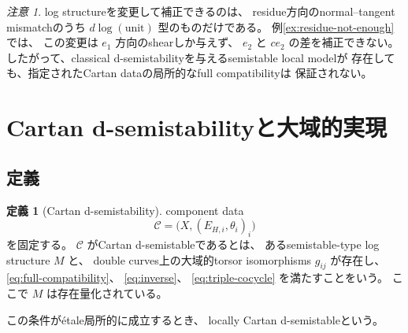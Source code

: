 \documentclass[uplatex,dvipdfmx,11pt]{jsarticle}
\numberwithin{equation}{section}
\theoremstyle{plain}
\theoremstyle{definition}
\newtheorem{definition}[theorem]{定義}
\theoremstyle{remark}
\newtheorem{remark}[theorem]{注意}
\newcommand{\calC}{\mathcal C}
\begin{document}
\begin{remark}
\label{rem:unit-limit}
log structureを変更して補正できるのは、
residue方向のnormal--tangent mismatchのうち
\(d\log(\text{unit})\) 型のものだけである。
例\ref{ex:residue-not-enough}では、
この変更は \(e_1\) 方向のshearしか与えず、
\(e_2\) と \(c e_2\) の差を補正できない。
したがって、classical d-semistabilityを与えるsemistable local modelが
存在しても、指定されたCartan dataの局所的なfull compatibilityは
保証されない。
\end{remark}

\section{Cartan d-semistabilityと大域的実現}
\label{sec:realization}

\subsection{定義}

\begin{definition}[Cartan d-semistability]
\label{def:cartan-d-semistability}
component data
\[
\calC=\bigl(X,(E_{H,i},\theta_i)_i\bigr)
\]
を固定する。
\(\calC\) がCartan d-semistableであるとは、
あるsemistable-type log structure \(M\) と、
double curves上の大域的torsor isomorphisms \(g_{ij}\) が存在し、
\eqref{eq:full-compatibility}、
\eqref{eq:inverse}、
\eqref{eq:triple-cocycle}
を満たすことをいう。
ここで \(M\) は存在量化されている。

この条件がétale局所的に成立するとき、
locally Cartan d-semistableという。
\end{definition}
\end{document}
